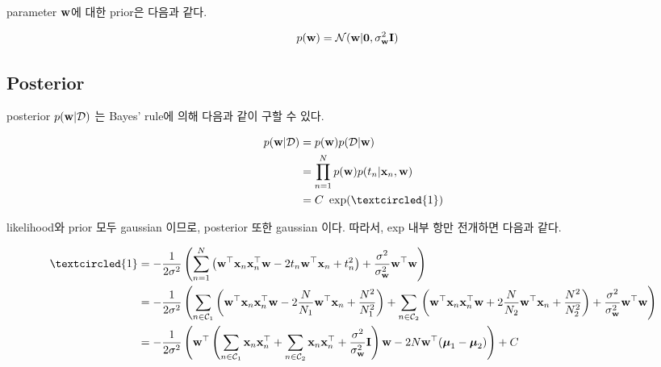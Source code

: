 \documentclass{article} %
\begin{document}
parameter ${\bf w}$에 대한 prior은 다음과 같다.

\begin{equation}
\begin{aligned}
	p({\bf w}) &= {\cal N} ({\bf w} | {\bf 0}, \sigma_{\bf w}^2 {\bf I})
\end{aligned}
\end{equation}

\subsection{Posterior}

posterior $p({\bf w} | {\cal D})$ 는 Bayes' rule에 의해 다음과 같이 구할 수 있다.

\begin{equation}
\begin{aligned}
	p({\bf w} | {\cal D}) &= p({\bf w}) p({\cal D} | {\bf w}) \\
	&= \prod_{n = 1}^N p({\bf w}) p(t_n | {\bf x}_n, {\bf w}) \\
	&= C ~ \exp( \textcircled{\scriptsize 1} )
\end{aligned}
\end{equation}

likelihood와 prior 모두 gaussian 이므로, posterior 또한 gaussian 이다. 따라서, exp 내부 항만 전개하면 다음과 같다.

\begin{equation}
\begin{aligned}
	\textcircled{\scriptsize 1} &= -\frac{1}{2\sigma^2}  \left( \sum_{n = 1}^N \left(  {\bf w}^\top{\bf x}_n{\bf x}_n^\top{\bf w} - 2 t_n {\bf w}^\top {\bf x}_n + t_n^2 \right) + \frac{\sigma^2}{\sigma_{\bf w} ^2} {\bf w}^\top {\bf w}  \right)
	\\
	&= -\frac{1}{2\sigma^2}  \left( \sum_{n \in {\cal C}_1} \left(  {\bf w}^\top{\bf x}_n{\bf x}_n^\top{\bf w} - 2 \frac{N}{N_1} {\bf w}^\top {\bf x}_n + \frac{N^2}{N_1^2} \right) + \sum_{n \in {\cal C}_2} \left(  {\bf w}^\top{\bf x}_n{\bf x}_n^\top{\bf w} + 2 \frac{N}{N_2} {\bf w}^\top {\bf x}_n + \frac{N^2}{N_2^2} \right) + \frac{\sigma^2}{\sigma_{\bf w} ^2} {\bf w}^\top {\bf w}  \right)
	\\
	&= -\frac{1}{2\sigma^2} \left(
		{\bf w}^\top \left(
			\sum_{n \in {\cal C}_1}{\bf x}_n {\bf x}_n^\top + \sum_{n \in {\cal C}_2}{\bf x}_n {\bf x}_n^\top + \frac{\sigma^2}{\sigma_{\bf w}^2} {\bf I}
		\right) {\bf w} - 2N{\bf w}^\top(\boldsymbol{\mu}_1 - \boldsymbol{\mu}_2)
	 \right) + C
\end{aligned} 
\end{equation}
\end{document}
